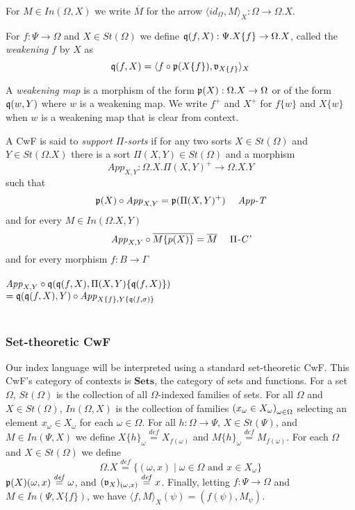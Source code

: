 \documentclass[sigplan,10pt,review,anonymous]{acmart}
\newcommand{\defeq}{\overset{\mathit{def}}{=}}
\newcommand{\mbf}[1]{\mathbf{#1}}
\newcommand{\fm}[2]{
\left(
\tiny
#1
\normalsize
\right)_{#2}
}
\begin{document}
For $M \in \mathit{In}(\Omega, X)$ we write $\overline{M}$ for the arrow $\langle \mathit{id}_{\Omega}, M \rangle_X : \Omega \to \Omega.X$. 

For $f : \Psi \to \Omega$ and $X \in \mathit{St}(\Omega)$ we define $\frak q(f, X) : \Psi.X \{ f \} \to \Omega . X$, called the \emph{weakening} $f$ by $X$ as
$$\frak q(f,X) = \langle f \circ \frak p(X \{ f \}), \frak v_{X \{ f \}} \rangle_X$$

A \emph{weakening map} is a morphism of the form $\frak p(X) : \Omega . X \to \Omega$ or of the form $\frak q(w, Y)$ where $w$ is a weakening map. We write $f^+$ and $X^+$ for $f \{ w \}$ and $X \{ w \}$ when $w$ is a weakening map that is clear from context.

A CwF is said to \emph{support $\Pi$-sorts} if for any two sorts $X \in \mathit{St}(\Omega)$ and $Y \in \mathit{St}(\Omega.X)$ there is a sort $\Pi(X,Y) \in \mathit{St}(\Omega)$ and a morphism $$\mathit{App}_{X,Y} : \Omega . X . \Pi(X,Y)^+ \to \Omega . X . Y$$ such that $$\frak p(X) \circ \mathit{App}_{X,Y} = \frak p(\Pi(X,Y)^+) \hspace{3.0ex} \textit{App-T}$$
and for every $M \in \mathit{In}(\Omega.X, Y)$
$$\mathit{App}_{X,Y} \circ \overline{M \{ p(X) \}} = \overline{M} \hspace{3.0ex} \Pi\textit{-C'}$$
and for every morphism $f : B \to \Gamma$\\~\\
$\mathit{App}_{X,Y} \circ \frak q( \frak q(f, X), \Pi(X,Y)\{ \frak q (f, X) \})$\\ 
$= \frak q(\frak q (f, X), Y) \circ \mathit{App}_{X \{ f \}, Y \{ \frak q(f, \sigma) \}}$\\~\\

\subsubsection{Set-theoretic CwF}

Our index language will be interpreted using a standard set-theoretic CwF. This CwF's category of contexts is $\mbf{Sets}$, the category of sets and functions. For a set $\Omega$, $\mathit{St}(\Omega)$ is the collection of all $\Omega$-indexed families of sets. For all $\Omega$ and $X \in \mathit{St}(\Omega)$, $\mathit{In}(\Omega,X)$ is the collection of families $\fm{x_\omega \in X_\omega}{\omega \in \Omega}$ selecting an element $x_\omega \in X_\omega$ for each $\omega \in \Omega$. For all $h : \Omega \to \Psi$, $X \in \mathit{St}(\Psi)$, and $M \in \mathit{In}(\Psi,X)$ we define $X \{ h \}_{\omega} \defeq X_{f(\omega)}$ and $M \{ h \}_\omega \defeq M_{f(\omega)}$. For each $\Omega$ and $X \in \mathit{St}(\Omega)$ we define $$\Omega . X \defeq \{ (\omega,x) \mid \omega \in \Omega \text{ and } x \in X_\omega \}$$ $\frak p (X)(\omega,x) \defeq \omega$, and $(\frak v_{X})_{(\omega,x)} \defeq x$. Finally, letting $f : \Psi \to \Omega$ and $M \in \mathit{In}(\Psi, X \{ f \})$, we have $\langle f, M \rangle_X(\psi) = (f(\psi), M_{\psi})$.
\end{document}
